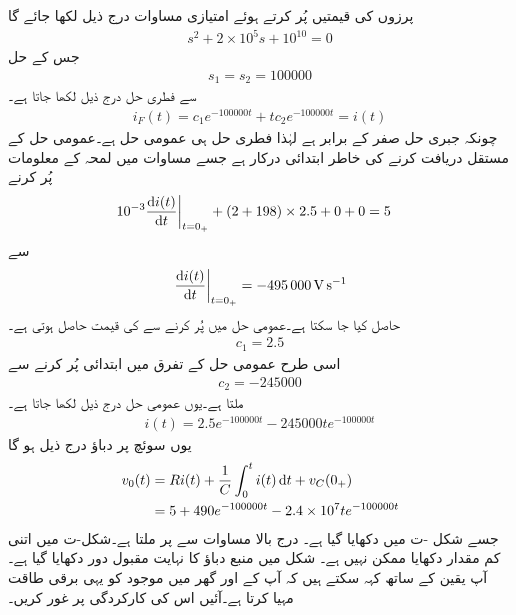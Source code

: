پرزوں کی قیمتیں پُر کرتے ہوئے امتیازی مساوات درج ذیل لکھا جائے گا
\begin{align*}
s^2+2\times 10^5 s+10^{10}=0
\end{align*}
جس کے حل
\begin{align*}
s_1=s_2=\num{100000}
\end{align*}
سے فطری حل درج ذیل لکھا جاتا ہے۔
\begin{align*}
i_F(t)=c_1e^{-100000t}+t c_2e^{-100000t}=i(t)
\end{align*}
چونکہ جبری حل صفر کے برابر ہے لہٰذا فطری حل ہی عمومی حل  ہے۔عمومی حل کے مستقل دریافت کرنے کی خاطر ابتدائی  درکار  ہے جسے مساوات   میں لمحہ  کے معلومات پُر کرنے
\begin{align*}
\left. 10^{-3}\frac{\dif i(t)}{\dif t}\right|_{t=0_+}+(2+198)\times 2.5+0+0&=5
\end{align*}
سے
\begin{align*}
\left. \frac{\dif i(t)}{\dif t}\right|_{t=0_+}=\SI{-495000}{\volt\per\second}
\end{align*}
حاصل کیا جا سکتا ہے۔عمومی حل میں  پُر کرنے سے   کی قیمت حاصل ہوتی ہے۔
\begin{align*}
c_1=2.5
\end{align*}
اسی طرح عمومی حل کے تفرق میں ابتدائی  پُر کرنے سے
\begin{align*}
c_2=\num{-245000}
\end{align*}
ملتا ہے۔یوں عمومی حل درج ذیل لکھا جاتا ہے۔
\begin{align*}
i(t)=2.5e^{-100000t}-245000 t e^{-100000t}
\end{align*}
یوں سوئچ پر دباؤ درج ذیل ہو گا
\begin{align*}
v_0(t)&=Ri(t)+\frac{1}{C}\int_{0}^{t} i(t) \dif t+v_C(0_+)\\
&=5+490e^{-100000t}-2.4\times 10^7 t e^{-100000 t}
\end{align*}
جسے شکل -ت میں دکھایا گیا ہے۔ درج بالا مساوات سے  پر  ملتا ہے۔شکل-ت میں اتنی کم مقدار دکھایا ممکن نہیں ہے۔
شکل  میں منبع دباؤ کا نہایت مقبول دور دکھایا گیا ہے۔آپ یقین کے ساتھ کہہ سکتے ہیں کہ آپ کے  اور گھر میں موجود  کو یہی برقی طاقت مہیا کرتا ہے۔آئیں اس کی کارکردگی پر غور کریں۔

